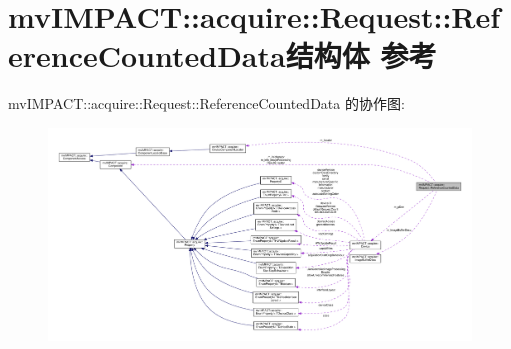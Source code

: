 \hypertarget{structmv_i_m_p_a_c_t_1_1acquire_1_1_request_1_1_reference_counted_data}{\section{mv\+I\+M\+P\+A\+C\+T\+:\+:acquire\+:\+:Request\+:\+:Reference\+Counted\+Data结构体 参考}
\label{structmv_i_m_p_a_c_t_1_1acquire_1_1_request_1_1_reference_counted_data}
}


mv\+I\+M\+P\+A\+C\+T\+:\+:acquire\+:\+:Request\+:\+:Reference\+Counted\+Data 的协作图\+:
\nopagebreak
\begin{figure}[H]
\begin{center}
\leavevmode
\includegraphics[width=350pt]{structmv_i_m_p_a_c_t_1_1acquire_1_1_request_1_1_reference_counted_data__coll__graph}
\end{center}
\end{figure}
